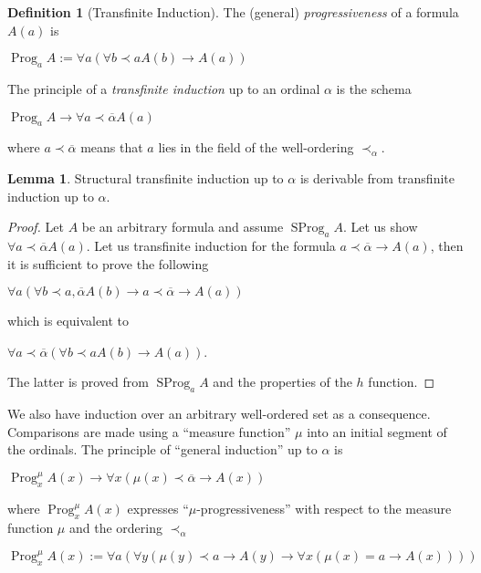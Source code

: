 \documentclass[8pt]{article}
\theoremstyle{definition}
\newtheorem{definition}{Definition}[section]
\theoremstyle{definition}
\theoremstyle{definition}
\theoremstyle{definition}
\theoremstyle{definition}
\theoremstyle{definition}
\theoremstyle{definition}
\theoremstyle{definition}
\newtheorem{lemma}{Lemma}[section]
\theoremstyle{definition}
\theoremstyle{definition}
\theoremstyle{definition}
\theoremstyle{definition}
\theoremstyle{definition}
\theoremstyle{question}
\begin{document}
\begin{definition}[Transfinite Induction]

  The (general) \emph{progressiveness} of a formula $A(a)$ is
  \begin{center}
    $\operatorname{Prog}_a A := \forall a (\forall b \prec a A(b) \to A(a))$
  \end{center}

  The principle of a \emph{transfinite induction} up to an ordinal $\alpha$ is the schema
  \begin{center}
    $\operatorname{Prog}_a A \to \forall a \prec \overline{\alpha} A (a)$
  \end{center}
  where $a \prec \overline{\alpha}$ means that $a$ lies in the field of the well-ordering
  $\prec_{\alpha}$.
\end{definition}

\begin{lemma}
  Structural transfinite induction up to $\alpha$ is derivable from transfinite induction up to $\alpha$.
\end{lemma}

\begin{proof}
  Let $A$ be an arbitrary formula and assume $\operatorname{SProg}_a A$. Let us show
  $\forall a \prec \overline{\alpha} A(a)$. Let us transfinite induction for the formula 
  $a \prec \overline{\alpha} \to A(a)$, then it is sufficient to prove the following
  \begin{center}
    $\forall a (\forall b \prec a, \overline{\alpha} A(b) \to a \prec \overline{\alpha} \to A(a))$
  \end{center}
  which is equivalent to
  \begin{center}
    $\forall a \prec \overline{\alpha} (\forall b \prec a A(b) \to A(a))$.
  \end{center}
  The latter is proved from $\operatorname{SProg}_a A$ and the properties of the $h$ function.
\end{proof}

We also have induction over an arbitrary well-ordered set as a consequence. 
Comparisons are made using a ``measure function'' $\mu$ into an initial segment of the ordinals. 
The principle of ``general induction'' up to $\alpha$ is
\begin{center}
  $\operatorname{Prog}^{\mu}_x A(x) \to \forall x (\mu(x) \prec \overline{\alpha} \to A(x))$
\end{center}
where $\operatorname{Prog}^{\mu}_x A(x)$ expresses ``$\mu$-progressiveness'' with respect to the measure function $\mu$
and the ordering $\prec_{\alpha}$
\begin{center}
  $\operatorname{Prog}^{\mu}_x A(x) := \forall a (\forall y (\mu(y) \prec a \to A(y) \to \forall x (\mu(x) = a \to A(x))))$
\end{center}
\end{document}

